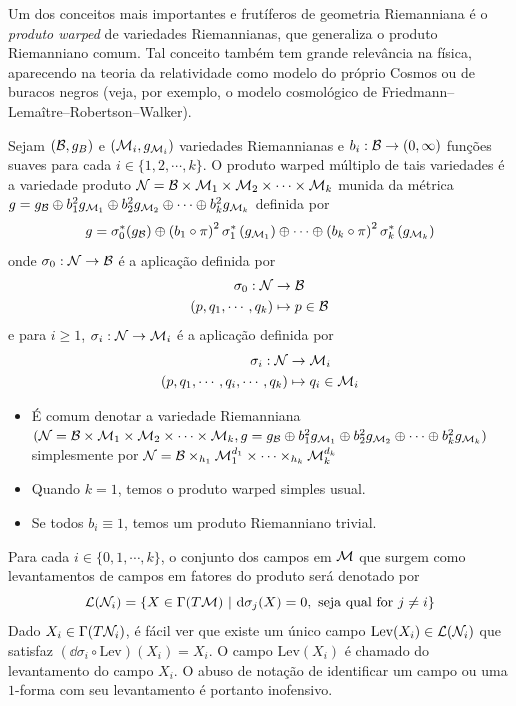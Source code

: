         Um dos conceitos mais importantes e frutíferos de geometria Riemanniana é o \emph{produto warped} de variedades Riemannianas, que generaliza o produto Riemanniano comum. Tal conceito também tem grande relevância na física, aparecendo na teoria da relatividade como modelo do próprio Cosmos ou de buracos negros (veja, por exemplo, o modelo cosmológico de Friedmann–Lemaître–Robertson–Walker). 


\begin{deff}
Sejam $(\mathcal{B}, g_{B})$ e $(\mathcal{M}_i, g_{\mathcal{M}_i})$ variedades Riemannianas e $b_i: \mathcal{B} \to (0, \infty)$ funções suaves para cada $i \in \{1, 2, \cdots, k \}$. O produto warped múltiplo de tais variedades é a variedade produto $\mathcal{N} = \mathcal{B} \times \mathcal{M}_1 \times \mathcal{M}_2 \times \cdots \times \mathcal{M}_k $ munida da métrica $g = g_{\mathcal{B}} \oplus b_1^2 g_{\mathcal{M}_1} \oplus b_2^2 g_{\mathcal{M}_2} \oplus \cdots \oplus b_{k}^2 g_{\mathcal{M}_k}$ definida por
\[
g = \sigma_0^{*} (g_{\mathcal{B}}) \oplus \left(b_1 \circ \pi \right)^2 \sigma_1^{*}\left(g_{\mathcal{M}_1} \right ) \oplus \cdots \oplus \left(b_k \circ \pi \right)^2 \sigma_{k}^{*} \left( g_{\mathcal{M}_k} \right)
\]
onde $\sigma_0 : \mathcal{N} \to \mathcal{B}$ é a aplicação definida por
\begin{align*}
\sigma_0: \mathcal{N} &\to \mathcal{B} \\
(p, q_1, \cdots, q_k) &\mapsto p \in \mathcal{B}
\end{align*}
e para $i \geq 1$, $\sigma_i : \mathcal{N} \to \mathcal{M}_i$ é a aplicação definida por
\begin{align*}
\sigma_i: \mathcal{N} &\to \mathcal{M}_i \\
(p, q_1, \cdots, q_i, \cdots, q_k) &\mapsto q_i \in \mathcal{M}_i
\end{align*}
\end{deff}


\begin{oobs}
\begin{itemize} \item É comum denotar a variedade Riemanniana $(\mathcal{N}  =  \mathcal{B} \times \mathcal{M}_1 \times \mathcal{M}_2 \times \cdots \times \mathcal{M}_k, g = g_{\mathcal{B}} \oplus b_1^2 g_{\mathcal{M}_1} \oplus b_2^2 g_{\mathcal{M}_2} \oplus \cdots \oplus b_{k}^2 g_{\mathcal{M}_k})$ simplesmente por $\mathcal{N} = \mathcal{B} \times_{h_1} \mathcal{M}_1^{d_1} \times \cdots \times_{h_k} \mathcal{M}_{k}^{d_k}$
\item Quando $k = 1$, temos o produto warped simples usual. 
\item Se todos $b_i \equiv 1$, temos um produto Riemanniano trivial. 
\end{itemize}
\end{oobs}

\begin{oobs}
    Para cada $i \in \{0, 1, \cdots, k\}$, o conjunto dos campos em $\mathcal{M}$ que surgem como levantamentos de campos em fatores do produto será denotado por
    \[
    \mathcal{L}(\mathcal{N}_i) = \{ X \in \Gamma(T \mathcal{M}) \ \vert \ \mathrm{d} \sigma_j (X) = 0, \text{ seja qual for $j\neq i$} \}
    \]
    Dado $X_i \in \Gamma(T \mathcal{N}_i)$, é fácil ver que existe um único campo $\text{Lev}(X_i) \in \mathcal{L}(\mathcal{N}_i) $ que satisfaz $\left( \dd \sigma_i \circ \text{Lev} \right)(X_i) = X_i$. O campo $\text{Lev}(X_i)$ é chamado do levantamento do campo $X_i$. O abuso de notação de identificar um campo ou uma $1$-forma com seu levantamento é portanto inofensivo.
    \end{oobs}

